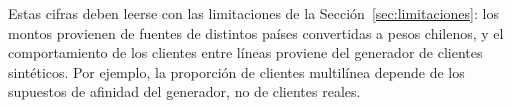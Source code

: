 Estas cifras deben leerse con las limitaciones de la
Sección~\ref{sec:limitaciones}: los montos provienen de fuentes de distintos
países convertidas a pesos chilenos, y el comportamiento de los clientes entre
líneas proviene del generador de clientes sintéticos. Por ejemplo, la
proporción de clientes multilínea depende de los supuestos de afinidad del
generador, no de clientes reales.

